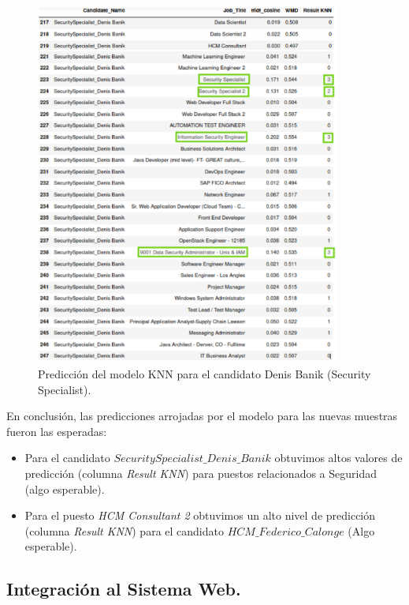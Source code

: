 \documentclass[12pt,a4paper]{article}
\begin{document}
\begin{sloppypar}
\begin{figure}[H]   
\centering
\includegraphics[width=0.9\textwidth]{images/implementacion_5/prediccion_denis.png}
\caption{Predicción del modelo KNN para el candidato Denis Banik (Security Specialist).}
\label{fig:prediccion_denis}
\end{figure}

En conclusión, las predicciones arrojadas por el modelo para las nuevas muestras fueron las esperadas:
\begin{itemize}
\item Para el candidato \textit{$SecuritySpecialist\_Denis\_Banik$} obtuvimos altos valores de predicción (columna \textit{Result KNN}) para puestos relacionados a Seguridad (algo esperable).
\item Para el puesto \textit{HCM Consultant 2} obtuvimos un alto nivel de predicción (columna \textit{Result KNN}) para el candidato \textit{$HCM\_Federico\_Calonge$} (Algo esperable).
\end{itemize}

\cleardoublepage

\subsection{Integración al Sistema Web.}\label{5.5.IntegracionalSistemaWeb}


\end{sloppypar}
\end{document}

